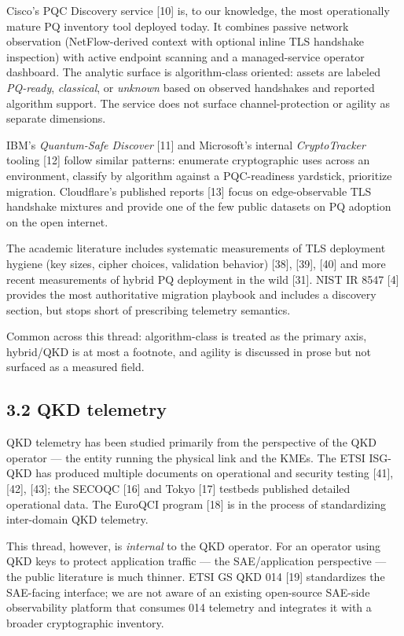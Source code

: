 Cisco's PQC Discovery service {[}10{]} is, to our knowledge, the most
operationally mature PQ inventory tool deployed today. It combines
passive network observation (NetFlow-derived context with optional
inline TLS handshake inspection) with active endpoint scanning and a
managed-service operator dashboard. The analytic surface is
algorithm-class oriented: assets are labeled \emph{PQ-ready},
\emph{classical}, or \emph{unknown} based on observed handshakes and
reported algorithm support. The service does not surface
channel-protection or agility as separate dimensions.

IBM's \emph{Quantum-Safe Discover} {[}11{]} and Microsoft's internal
\emph{CryptoTracker} tooling {[}12{]} follow similar patterns: enumerate
cryptographic uses across an environment, classify by algorithm against
a PQC-readiness yardstick, prioritize migration. Cloudflare's published
reports {[}13{]} focus on edge-observable TLS handshake mixtures and
provide one of the few public datasets on PQ adoption on the open
internet.

The academic literature includes systematic measurements of TLS
deployment hygiene (key sizes, cipher choices, validation behavior)
{[}38{]}, {[}39{]}, {[}40{]} and more recent measurements of hybrid PQ
deployment in the wild {[}31{]}. NIST IR 8547 {[}4{]} provides the most
authoritative migration playbook and includes a discovery section, but
stops short of prescribing telemetry semantics.

Common across this thread: algorithm-class is treated as the primary
axis, hybrid/QKD is at most a footnote, and agility is discussed in
prose but not surfaced as a measured field.

\subsection{3.2 QKD telemetry}\label{qkd-telemetry}

QKD telemetry has been studied primarily from the perspective of the QKD
operator --- the entity running the physical link and the KMEs. The ETSI
ISG-QKD has produced multiple documents on operational and security
testing {[}41{]}, {[}42{]}, {[}43{]}; the SECOQC {[}16{]} and Tokyo
{[}17{]} testbeds published detailed operational data. The EuroQCI
program {[}18{]} is in the process of standardizing inter-domain QKD
telemetry.

This thread, however, is \emph{internal} to the QKD operator. For an
operator using QKD keys to protect application traffic --- the
SAE/application perspective --- the public literature is much thinner.
ETSI GS QKD 014 {[}19{]} standardizes the SAE-facing interface; we are
not aware of an existing open-source SAE-side observability platform
that consumes 014 telemetry and integrates it with a broader
cryptographic inventory.

